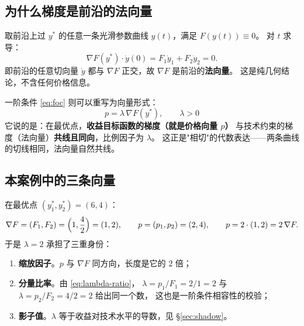 \subsection{为什么梯度是前沿的法向量}

取前沿上过 $y^{*}$ 的任意一条光滑参数曲线 $y(t)$，满足 $F(y(t))\equiv 0$。
对 $t$ 求导：
\begin{equation}
\nabla F(y^{*})\cdot \dot y(0)=F_1\dot y_1+F_2\dot y_2=0.
\label{eq:normal}
\end{equation}
即前沿的任意切向量 $\dot y$ 都与 $\nabla F$ 正交，故 $\nabla F$ 是前沿的\textbf{法向量}。
这是纯几何结论，不含任何价格信息。

一阶条件 \eqref{eq:foc} 则可以重写为向量形式：
\begin{equation}
\boxed{\ p=\lambda\,\nabla F(y^{*}),\qquad \lambda>0\ }
\label{eq:p-lambda-nabla}
\end{equation}
它说的是：在最优点，\textbf{收益目标函数的梯度（就是价格向量 $p$）}
与技术约束的梯度（法向量）\textbf{共线且同向}，比例因子为 $\lambda$。
这正是"相切"的代数表达——两条曲线的切线相同，法向量自然共线。

\subsection{本案例中的三条向量}

在最优点 $(y_1^{*},y_2^{*})=(6,4)$：
\begin{equation}
\nabla F=(F_1,F_2)=\Bigl(1,\frac{4}{2}\Bigr)=(1,2),
\qquad
p=(p_1,p_2)=(2,4),
\qquad
p=2\cdot(1,2)=2\,\nabla F.
\label{eq:vectors}
\end{equation}
于是 $\lambda=2$ 承担了三重身份：

\begin{enumerate}
  \item \textbf{缩放因子}。$p$ 与 $\nabla F$ 同方向，长度是它的 $2$ 倍；
  \item \textbf{分量比率}。由 \eqref{eq:lambda-ratio}，
        $\lambda=p_1/F_1=2/1=2$ 与 $\lambda=p_2/F_2=4/2=2$ 给出同一个数，
        这也是一阶条件相容性的校验；
  \item \textbf{影子值}。$\lambda$ 等于收益对技术水平的导数，见 \S\ref{sec:shadow}。
\end{enumerate}

